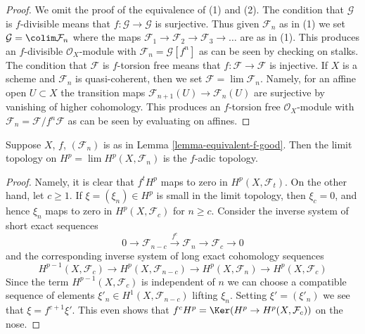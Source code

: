 \begin{proof}
We omit the proof of the equivalence of (1) and (2).
The condition that $\mathcal{G}$ is $f$-divisible means that
$f : \mathcal{G} \to \mathcal{G}$ is surjective.
Thus given $\mathcal{F}_n$ as in (1) we set
$\mathcal{G} = \colim \mathcal{F}_n$ where the maps
$\mathcal{F}_1 \to \mathcal{F}_2 \to \mathcal{F}_3 \to \ldots$
are as in (1). This produces an $f$-divisible $\mathcal{O}_X$-module
with $\mathcal{F}_n = \mathcal{G}[f^n]$ as can be seen by
checking on stalks.
The condition that $\mathcal{F}$ is $f$-torsion free means that
$f : \mathcal{F} \to \mathcal{F}$ is injective.
If $X$ is a scheme and $\mathcal{F}_n$ is quasi-coherent,
then we set $\mathcal{F} = \lim \mathcal{F}_n$. Namely, for an
affine open $U \subset X$ the transition maps
$\mathcal{F}_{n + 1}(U) \to \mathcal{F}_n(U)$ are surjective
by vanishing of higher cohomology. This produces an $f$-torsion free
$\mathcal{O}_X$-module with
$\mathcal{F}_n = \mathcal{F}/f^n\mathcal{F}$ as can be seen
by evaluating on affines.
\end{proof}

\begin{lemma}
\label{lemma-topology-I-adic-f}
Suppose $X$, $f$, $(\mathcal{F}_n)$ is as in
Lemma \ref{lemma-equivalent-f-good}. Then the limit topology on
$H^p = \lim H^p(X, \mathcal{F}_n)$ is the $f$-adic topology.
\end{lemma}

\begin{proof}
Namely, it is clear that $f^t H^p$ maps to zero in $H^p(X, \mathcal{F}_t)$.
On the other hand, let $c \geq 1$. If $\xi = (\xi_n) \in H^p$ is small in the
limit topology, then $\xi_c = 0$, and hence $\xi_n$
maps to zero in $H^p(X, \mathcal{F}_c)$ for $n \geq c$.
Consider the inverse system of short exact sequences
$$
0 \to \mathcal{F}_{n - c} \xrightarrow{f^c} \mathcal{F}_n \to
\mathcal{F}_c \to 0
$$
and the corresponding inverse system of long exact cohomology sequences
$$
H^{p - 1}(X, \mathcal{F}_c) \to
H^p(X, \mathcal{F}_{n - c}) \to
H^p(X, \mathcal{F}_n) \to
H^p(X, \mathcal{F}_c)
$$
Since the term $H^{p - 1}(X, \mathcal{F}_c)$ is independent of
$n$ we can choose a compatible sequence of elements
$\xi'_n \in H^1(X, \mathcal{F}_{n - c})$
lifting $\xi_n$. Setting $\xi' = (\xi'_n)$ we see that
$\xi = f^{c + 1} \xi'$. This even shows that
$f^c H^p = \Ker(H^p \to H^p(X, \mathcal{F}_c))$ on the nose.
\end{proof}

